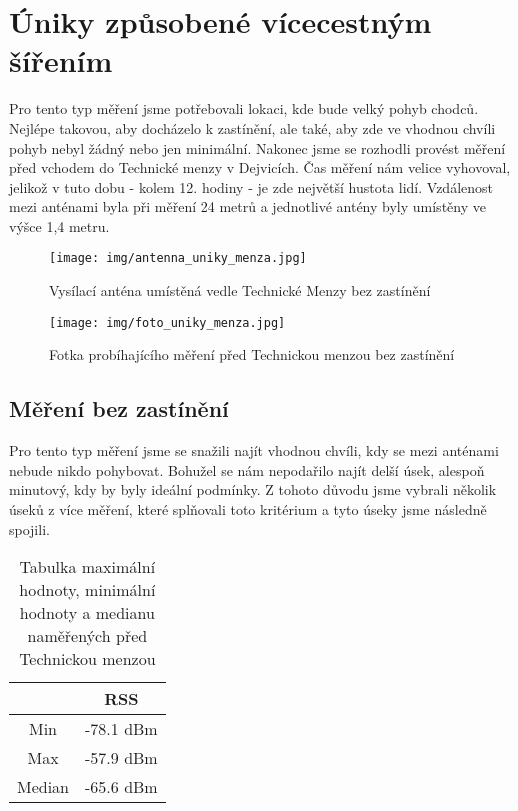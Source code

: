 \chapter{Úniky způsobené vícecestným šířením}
Pro tento typ měření jsme potřebovali lokaci, kde bude velký pohyb chodců. Nejlépe takovou, aby docházelo k zastínění, ale také, aby zde ve vhodnou chvíli pohyb nebyl žádný nebo jen minimální. Nakonec jsme se rozhodli provést měření před vchodem do Technické menzy v Dejvicích. Čas měření nám velice vyhovoval, jelikož v tuto dobu - kolem 12. hodiny - je zde největší hustota lidí. Vzdálenost mezi anténami byla při měření 24 metrů a jednotlivé antény byly umístěny ve výšce 1,4 metru.

\begin{figure}[h!]
    \centering
    \texttt{[image: img/antenna\_uniky\_menza.jpg]}
    \caption{Vysílací anténa umístěná vedle Technické Menzy bez zastínění}
    \label{fig:my_label}
\end{figure}

\begin{figure}[h!]
    \centering
    \texttt{[image: img/foto\_uniky\_menza.jpg]}
    \caption{Fotka probíhajícího měření před Technickou menzou bez zastínění}
    \label{fig:my_label}
\end{figure}

\section{Měření bez zastínění}
Pro tento typ měření jsme se snažili najít vhodnou chvíli, kdy se mezi anténami nebude nikdo pohybovat. Bohužel se nám nepodařilo najít delší úsek, alespoň minutový, kdy by byly ideální podmínky. Z tohoto důvodu jsme vybrali několik úseků z více měření, které splňovali toto kritérium a tyto úseky jsme následně spojili.

\begin{table}[h!]
\centering
\begin{tabular}{|c|c|}
  \hline
   & RSS \\
  \hline
  Min & -78.1 dBm\\
  \hline
  Max & -57.9 dBm\\
  \hline
  Median & -65.6 dBm \\
  \hline
\end{tabular}
\caption{Tabulka maximální hodnoty, minimální hodnoty a medianu naměřených před Technickou menzou}
\end{table}

